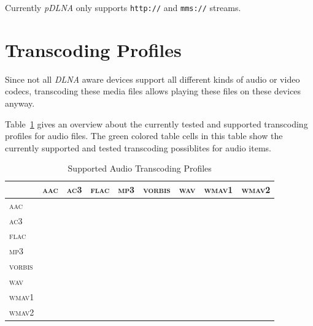 \documentclass[a4paper,oneside,10pt]{report}
\begin{document}
Currently {\em pDLNA} only supports \verb|http://| and \verb|mms://| streams.

\section{Transcoding Profiles}
\label{Transcoding_Profiles}

Since not all {\em DLNA} aware devices support all different kinds of audio or video codecs, transcoding these media files allows playing these files on these devices anyway.

Table~\ref{tab:supportedaudiotranscodingprofiles} gives an overview about the currently tested and supported transcoding profiles for audio files. The green colored table cells in this table show the currently supported and tested transcoding possiblites for audio items.

\begin{table}
	\centering
	\begin{tabular}{|p{4.7em}||p{2.8em}|p{2.8em}|p{2.8em}|p{2.8em}|p{2.8em}|p{2.8em}|p{2.8em}|p{2.8em}|}
		\hline
		\diagbox{Out}{In}		& \textsc{aac} 			& \textsc{ac3} 			& \textsc{flac} 			& \textsc{mp3} 				& \textsc{vorbis} 		& \textsc{wav} 				& \textsc{wmav1}		& \textsc{wmav2} \\
		\hline
		\hline
		\textsc{aac} 				& \cellcolor{Grey} 	&	\cellcolor{Green}	& \cellcolor{Green}		& \cellcolor{Green}		& \cellcolor{Green}		& \cellcolor{Green}		&										& \cellcolor{Green} \\
		\hline
		\textsc{ac3}				& \cellcolor{Green} &	\cellcolor{Grey}	& \cellcolor{Green}		& \cellcolor{Green}		& \cellcolor{Green}		& \cellcolor{Green}		&										& \cellcolor{Green} \\
		\hline
		\textsc{flac} 			& \cellcolor{Green} &	\cellcolor{Green}	& \cellcolor{Grey} 		& \cellcolor{Green}		& \cellcolor{Green}		& \cellcolor{Green}		&										& \cellcolor{Green} \\
		\hline
		\textsc{mp3} 				& \cellcolor{Green} &	\cellcolor{Green}	& \cellcolor{Green}		& \cellcolor{Grey} 		& \cellcolor{Green}		& \cellcolor{Green}		&										& \cellcolor{Green} \\
		\hline
		\textsc{vorbis} 		& \cellcolor{Green} & \cellcolor{Green}	& \cellcolor{Green}	 	& \cellcolor{Green}		& \cellcolor{Grey} 		& \cellcolor{Green}		&										& \cellcolor{Green} \\
		\hline
		\textsc{wav} 				& \cellcolor{Green}	&	\cellcolor{Green}	& \cellcolor{Green}		& \cellcolor{Green} 	& \cellcolor{Green}		& \cellcolor{Grey} 		&										& \cellcolor{Green} \\
		\hline
		\textsc{wmav1}			& 									&										& 										& 										& 										& 										& \cellcolor{Grey} &										\\
		\hline
		\textsc{wmav2}			& \cellcolor{Green}	&	\cellcolor{Green}	& \cellcolor{Green}		& \cellcolor{Green}		& \cellcolor{Green}		& \cellcolor{Green}		&										& \cellcolor{Grey} \\
		\hline
	\end{tabular}
	\caption{Supported Audio Transcoding Profiles}
	\label{tab:supportedaudiotranscodingprofiles}
\end{table}
\end{document}
